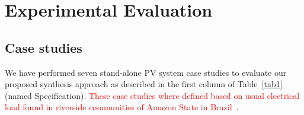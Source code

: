 \documentclass[review]{elsarticle}
\begin{document}
\section{Experimental Evaluation}
\label{sec:Results}

\subsection{Case studies} 

We have performed seven stand-alone PV system case studies to evaluate our proposed synthesis approach as described in the first column of Table~\ref{tab1} (named Specification). \textcolor{red}{These case studies where defined based on usual electrical load found in riverside communities of Amazon State in Brazil~\cite{Agrener2013}}. 
\end{document}
